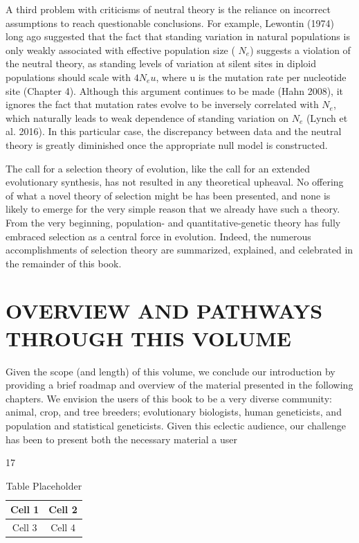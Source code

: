 \documentclass{article}
\begin{document}
A third problem with criticisms of neutral theory is the reliance on incorrect assumptions to reach questionable conclusions. For example, Lewontin (1974) long ago suggested that the fact that standing variation in natural populations is only weakly associated with effective population size ( $ N_{e} $) suggests a violation of the neutral theory, as standing levels of variation at silent sites in diploid populations should scale with  $ 4N_{e}u $, where u is the mutation rate per nucleotide site (Chapter 4). Although this argument continues to be made (Hahn 2008), it ignores the fact that mutation rates evolve to be inversely correlated with  $ N_{e} $, which naturally leads to weak dependence of standing variation on  $ N_{e} $ (Lynch et al. 2016). In this particular case, the discrepancy between data and the neutral theory is greatly diminished once the appropriate null model is constructed.

The call for a selection theory of evolution, like the call for an extended evolutionary synthesis, has not resulted in any theoretical upheaval. No offering of what a novel theory of selection might be has been presented, and none is likely to emerge for the very simple reason that we already have such a theory. From the very beginning, population- and quantitative-genetic theory has fully embraced selection as a central force in evolution. Indeed, the numerous accomplishments of selection theory are summarized, explained, and celebrated in the remainder of this book.

\section{OVERVIEW AND PATHWAYS THROUGH THIS VOLUME}
Given the scope (and length) of this volume, we conclude our introduction by providing a brief roadmap and overview of the material presented in the following chapters. We envision the users of this book to be a very diverse community: animal, crop, and tree breeders; evolutionary biologists, human geneticists, and population and statistical geneticists. Given this eclectic audience, our challenge has been to present both the necessary material a user

17

\begin{table}[h]
\centering
\begin{tabular}{|c|c|}
\hline
Cell 1 & Cell 2 \\
\hline
Cell 3 & Cell 4 \\
\hline
\end{tabular}
\caption{Table Placeholder}
\end{table}
\end{document}
